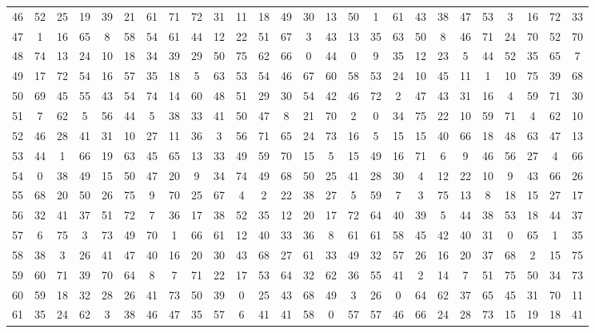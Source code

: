 \begin{table}
\begin{tabular}{c c c c c c c c c c c c c c c c c c c c c c c c c c }
46 & 52 & 25 & 19 & 39 & 21 & 61 & 71 & 72 & 31 & 11 & 18 & 49 & 30 & 13 & 50 & 1 & 61 & 43 & 38 & 47 & 53 & 3 & 16 & 72 & 33 \\
47 & 1 & 16 & 65 & 8 & 58 & 54 & 61 & 44 & 12 & 22 & 51 & 67 & 3 & 43 & 13 & 35 & 63 & 50 & 8 & 46 & 71 & 24 & 70 & 52 & 70 \\
48 & 74 & 13 & 24 & 10 & 18 & 34 & 39 & 29 & 50 & 75 & 62 & 66 & 0 & 44 & 0 & 9 & 35 & 12 & 23 & 5 & 44 & 52 & 35 & 65 & 7 \\
49 & 17 & 72 & 54 & 16 & 57 & 35 & 18 & 5 & 63 & 53 & 54 & 46 & 67 & 60 & 58 & 53 & 24 & 10 & 45 & 11 & 1 & 10 & 75 & 39 & 68 \\
50 & 69 & 45 & 55 & 43 & 54 & 74 & 14 & 60 & 48 & 51 & 29 & 30 & 54 & 42 & 46 & 72 & 2 & 47 & 43 & 31 & 16 & 4 & 59 & 71 & 30 \\
51 & 7 & 62 & 5 & 56 & 44 & 5 & 38 & 33 & 41 & 50 & 47 & 8 & 21 & 70 & 2 & 0 & 34 & 75 & 22 & 10 & 59 & 71 & 4 & 62 & 10 \\
52 & 46 & 28 & 41 & 31 & 10 & 27 & 11 & 36 & 3 & 56 & 71 & 65 & 24 & 73 & 16 & 5 & 15 & 15 & 40 & 66 & 18 & 48 & 63 & 47 & 13 \\
53 & 44 & 1 & 66 & 19 & 63 & 45 & 65 & 13 & 33 & 49 & 59 & 70 & 15 & 5 & 15 & 49 & 16 & 71 & 6 & 9 & 46 & 56 & 27 & 4 & 66 \\
54 & 0 & 38 & 49 & 15 & 50 & 47 & 20 & 9 & 34 & 74 & 49 & 68 & 50 & 25 & 41 & 28 & 30 & 4 & 12 & 22 & 10 & 9 & 43 & 66 & 26 \\
55 & 68 & 20 & 50 & 26 & 75 & 9 & 70 & 25 & 67 & 4 & 2 & 22 & 38 & 27 & 5 & 59 & 7 & 3 & 75 & 13 & 8 & 18 & 15 & 27 & 17 \\
56 & 32 & 41 & 37 & 51 & 72 & 7 & 36 & 17 & 38 & 52 & 35 & 12 & 20 & 17 & 72 & 64 & 40 & 39 & 5 & 44 & 38 & 53 & 18 & 44 & 37 \\
57 & 6 & 75 & 3 & 73 & 49 & 70 & 1 & 66 & 61 & 12 & 40 & 33 & 36 & 8 & 61 & 61 & 58 & 45 & 42 & 40 & 31 & 0 & 65 & 1 & 35 \\
58 & 38 & 3 & 26 & 41 & 47 & 40 & 16 & 20 & 30 & 43 & 68 & 27 & 61 & 33 & 49 & 32 & 57 & 26 & 16 & 20 & 37 & 68 & 2 & 15 & 75 \\
59 & 60 & 71 & 39 & 70 & 64 & 8 & 7 & 71 & 22 & 17 & 53 & 64 & 32 & 62 & 36 & 55 & 41 & 2 & 14 & 7 & 51 & 75 & 50 & 34 & 73 \\
60 & 59 & 18 & 32 & 28 & 26 & 41 & 73 & 50 & 39 & 0 & 25 & 43 & 68 & 49 & 3 & 26 & 0 & 64 & 62 & 37 & 65 & 45 & 31 & 70 & 11 \\
61 & 35 & 24 & 62 & 3 & 38 & 46 & 47 & 35 & 57 & 6 & 41 & 41 & 58 & 0 & 57 & 57 & 46 & 66 & 24 & 28 & 73 & 15 & 19 & 18 & 41 \\

\end{tabular}
\end{table}
